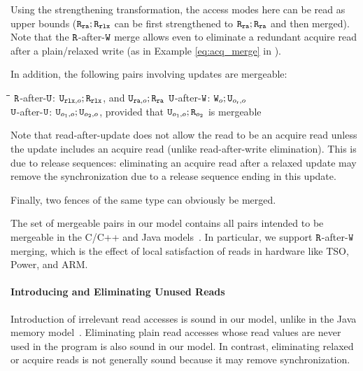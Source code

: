Using the strengthening transformation, the access modes here can be read as upper bounds
(\eg $\texttt{R}_{\texttt{ra}};\texttt{R}_{\texttt{rlx}}$ can be first strengthened to $\texttt{R}_{\texttt{ra}};\texttt{R}_{\texttt{ra}}$ and then merged).
Note that the  $\texttt{R}$-after-$\texttt{W}$ merge allows 
even to eliminate a redundant acquire read after a plain/relaxed write (as in Example \ref{eq:acq_merge} in ).

In addition, the following pairs involving updates are mergeable:
\begin{tabbing}
\hspace{1.5cm}\=\hspace{4.4cm}\=\hspace{1.5cm}\=\hspace{1.5cm}\kill
 $\texttt{R}$-after-$\texttt{U}$: \> $\texttt{U}_{\texttt{rlx}, o}; \texttt{R}_{\texttt{rlx}}$, and $\texttt{U}_{\texttt{ra}, o}; \texttt{R}_{\texttt{ra}}$ \> %
  $\texttt{U}$-after-$\texttt{W}$: \>   $\texttt{W}_o; \texttt{U}_{o_{\text{r}}, o}$ \\[1mm] %
 $\texttt{U}$-after-$\texttt{U}$: \>   $\texttt{U}_{o_1, o}; \texttt{U}_{o_2, o}$, provided that $\texttt{U}_{o_1, o}; \texttt{R}_{o_2}$ is mergeable 
\end{tabbing} 
Note that read-after-update does not allow the read to be an acquire read unless the update includes an acquire read
(unlike read-after-write elimination). This is due to release sequences:
 eliminating an acquire read after a relaxed update may remove the synchronization 
due to a release sequence ending in this update.
 
Finally, two fences of the same type can obviously be merged.

The set of mergeable pairs in our model contains all pairs intended to be mergeable in the C/C++ and Java models~\cite{c11comp,sevcik:jmm}.
In particular, we support $\texttt{R}$-after-$\texttt{W}$ merging, which is the effect of local satisfaction of reads
in hardware like TSO, Power, and ARM.

\paragraph{Introducing and Eliminating Unused Reads}
Introduction of irrelevant read accesses is sound in our model, unlike in the Java memory model~\cite{sevcik:jmm}.
Eliminating plain read accesses whose read values are never used in the program is also sound in our model.
In contrast, eliminating relaxed or acquire reads is not generally sound because it may remove synchronization.

